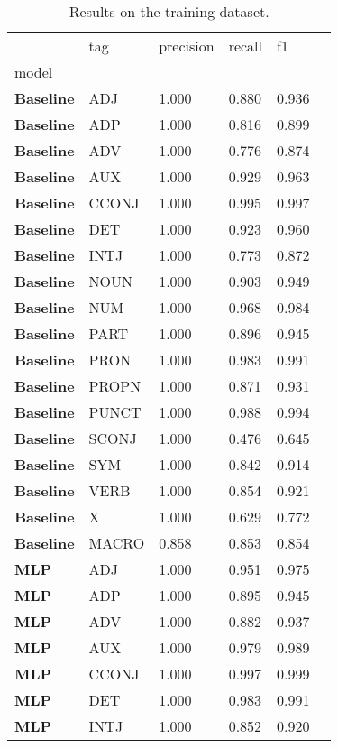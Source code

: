 \begin{table}
\caption{Results on the training dataset.}
\label{tab::ex_10_train}
\begin{tabular}{|l|l|l|l|l|l|}
\toprule
 & tag & precision & recall & f1 \\
model &  &  &  &  \\
\midrule
\textbf{Baseline} & ADJ & 1.000 & 0.880 & 0.936 \\
\textbf{Baseline} & ADP & 1.000 & 0.816 & 0.899 \\
\textbf{Baseline} & ADV & 1.000 & 0.776 & 0.874 \\
\textbf{Baseline} & AUX & 1.000 & 0.929 & 0.963 \\
\textbf{Baseline} & CCONJ & 1.000 & 0.995 & 0.997 \\
\textbf{Baseline} & DET & 1.000 & 0.923 & 0.960 \\
\textbf{Baseline} & INTJ & 1.000 & 0.773 & 0.872 \\
\textbf{Baseline} & NOUN & 1.000 & 0.903 & 0.949 \\
\textbf{Baseline} & NUM & 1.000 & 0.968 & 0.984 \\
\textbf{Baseline} & PART & 1.000 & 0.896 & 0.945 \\
\textbf{Baseline} & PRON & 1.000 & 0.983 & 0.991 \\
\textbf{Baseline} & PROPN & 1.000 & 0.871 & 0.931 \\
\textbf{Baseline} & PUNCT & 1.000 & 0.988 & 0.994 \\
\textbf{Baseline} & SCONJ & 1.000 & 0.476 & 0.645 \\
\textbf{Baseline} & SYM & 1.000 & 0.842 & 0.914 \\
\textbf{Baseline} & VERB & 1.000 & 0.854 & 0.921 \\
\textbf{Baseline} & X & 1.000 & 0.629 & 0.772 \\
\textbf{Baseline} & MACRO & 0.858 & 0.853 & 0.854 \\
\textbf{MLP} & ADJ & 1.000 & 0.951 & 0.975 \\
\textbf{MLP} & ADP & 1.000 & 0.895 & 0.945 \\
\textbf{MLP} & ADV & 1.000 & 0.882 & 0.937 \\
\textbf{MLP} & AUX & 1.000 & 0.979 & 0.989 \\
\textbf{MLP} & CCONJ & 1.000 & 0.997 & 0.999 \\
\textbf{MLP} & DET & 1.000 & 0.983 & 0.991 \\
\textbf{MLP} & INTJ & 1.000 & 0.852 & 0.920 \\

\end{tabular}
\end{table}
